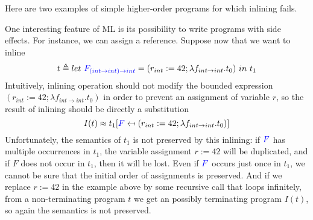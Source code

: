 \documentclass[a4paper,11pt,oneside]{article}
\theoremstyle{plain}
\newcommand{\tmlet}[3]{let~#1=#2~in~#3}
\newcommand{\tmsbst}[3]{#1 [#2 \mapsfrom #3] }
\begin{document}
Here are two examples of simple higher-order programs for which inlining fails.
%
%

One interesting feature of ML is its possibility to write programs with side
effects. For instance, we can assign a reference. 
Suppose now that we want to inline
	$$ t \triangleq 
	\tmlet 
            {\textcolor{blue}
            {F_{(int \rightarrow int) \rightarrow int}}}
	{(r_{int}:= 42; \lambda f_{int \rightarrow int}. t_0)}{t_1} $$
Intuitively, inlining operation should not modify the bounded expression
$(r_{int}:= 42; \lambda f_{int \rightarrow int}. t_0)$ in order to prevent an
assignment of variable $r$, so the result of inlining should be directly a
substitution
	$$ I(t) \approx 
	\tmsbst{t_1}
		{\textcolor{blue}{F}}
		{(r_{int}:= 42; \lambda f_{int \rightarrow int}. t_0)} $$ 
	Unfortunately, the semantics of $t_1$ is not preserved by this inlining: if
$\textcolor{blue}{F}$ has multiple occurrences in $t_1$, the variable
assignment $r:=42$ will be duplicated, and if $F$ does not occur in $t_1$,
then it will be lost. 
	Even if $\textcolor{blue}{F}$ occurs just once in
$t_1$, we cannot be sure that the initial order of assignments is
preserved.
 	And if we replace $r:=42$ in the example above by some recursive
call that loops infinitely, from a non-terminating program $t$ we get an possibly
terminating program $I(t)$, so again the semantics is not preserved. \\
\end{document}
